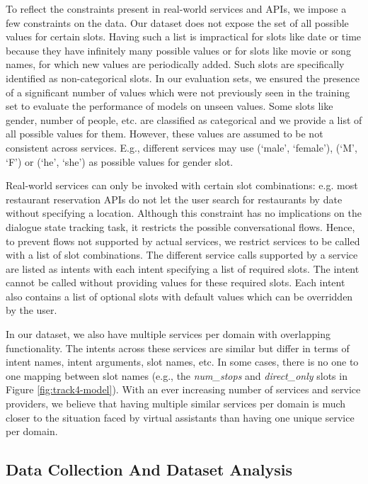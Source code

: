To reflect the constraints present in real-world services and APIs, we impose a few constraints on the data. Our dataset does not expose the set of all possible values for certain slots. Having such a list is impractical for slots like date or time because they have infinitely many possible values or for slots like movie or song names, for which new values are periodically added. Such slots are specifically identified as non-categorical slots. In our evaluation sets, we ensured the presence of a significant number of values which were not previously seen in the training set to evaluate the performance of models on unseen values. Some slots like gender, number of people, etc. are classified as categorical and we provide a list of all possible values for them. However, these values are assumed to be not consistent across services. E.g., different services may use (`male', `female'), (`M', `F') or (`he', `she') as possible values for gender slot.

Real-world services can only be invoked with certain slot combinations: e.g. most restaurant reservation APIs do not let the user search for restaurants by date without specifying a location. Although this constraint has no implications on the dialogue state tracking task, it restricts the possible conversational flows. Hence, to prevent flows not supported by actual services, we restrict services to be called with a list of slot combinations. The different service calls supported by a service are listed as intents with each intent specifying a list of required slots. The intent cannot be called without providing values for these required slots. Each intent also contains a list of optional slots with default values which can be overridden by the user.

In our dataset, we also have multiple services per domain with overlapping functionality. The intents across these services are similar but differ in terms of intent names, intent arguments, slot names, etc. In some cases, there is no one to one mapping between slot names (e.g., the \textit{num\_stops} and \textit{direct\_only} slots in Figure \ref{fig:track4-model}). With an ever increasing number of services and service providers, we believe that having multiple similar services per domain is much closer to the situation faced by virtual assistants than having one unique service per domain. 

\subsection{Data Collection And Dataset Analysis}\label{sec:data-collect}

